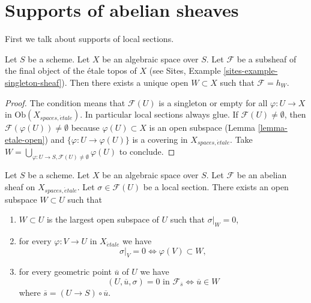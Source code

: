 \section{Supports of abelian sheaves}
\label{section-support}

\noindent
First we talk about supports of local sections.

\begin{lemma}
\label{lemma-support-subsheaf-final}
Let $S$ be a scheme. Let $X$ be an algebraic space over $S$.
Let $\mathcal{F}$ be a subsheaf of the final object of the \'etale
topos of $X$ (see
Sites, Example \ref{sites-example-singleton-sheaf}).
Then there exists a unique open
$W \subset X$ such that $\mathcal{F} = h_W$.
\end{lemma}

\begin{proof}
The condition means that $\mathcal{F}(U)$ is a singleton or
empty for all $\varphi : U \to X$ in $\text{Ob}(X_{spaces, \acute{e}tale})$.
In particular local sections always glue. If
$\mathcal{F}(U) \not = \emptyset$, then
$\mathcal{F}(\varphi(U)) \not = \emptyset$ because
$\varphi(U) \subset X$ is an open subspace 
(Lemma \ref{lemma-etale-open})
and
$\{\varphi : U \to \varphi(U)\}$ is a covering in $X_{spaces, \acute{e}tale}$.
Take
$W = \bigcup_{\varphi : U \to S, \mathcal{F}(U) \not = \emptyset} \varphi(U)$
to conclude.
\end{proof}

\begin{lemma}
\label{lemma-zero-over-image}
Let $S$ be a scheme.
Let $X$ be an algebraic space over $S$.
Let $\mathcal{F}$ be an abelian sheaf on $X_{spaces, \acute{e}tale}$.
Let $\sigma \in \mathcal{F}(U)$ be a local section.
There exists an open subspace $W \subset U$ such that
\begin{enumerate}
\item $W \subset U$ is the largest open subspace of $U$ such
that $\sigma|_W = 0$,
\item for every $\varphi : V \to U$ in $X_{\acute{e}tale}$ we have
$$
\sigma|_V = 0 \Leftrightarrow \varphi(V) \subset W,
$$
\item for every geometric point $\overline{u}$ of $U$ we have
$$
(U, \overline{u}, \sigma) = 0\text{ in }\mathcal{F}_{\overline{s}}
\Leftrightarrow
\overline{u} \in W
$$
where $\overline{s} = (U \to S) \circ \overline{u}$.
\end{enumerate}
\end{lemma}

